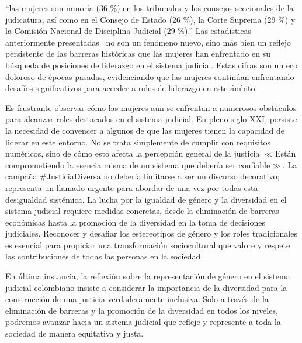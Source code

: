 \documentclass[letterpaper, 12pt]{article}
\renewcommand{\comment}[1]{{\small $\ll$#1$\gg$}}
\begin{document}
“las mujeres son minoría (36 \%) en los tribunales y los consejos
seccionales de la judicatura, así como en el Consejo de Estado
(26 \%), la Corte Suprema (29 \%) y la Comisión Nacional de
Disciplina Judicial (29 \%).” Las estadísticas anteriormente
presentadas~\cite{Dejusticia_2023_MariaAdelaida} no son un fenómeno nuevo,
sino más bien un
reflejo persistente de las barreras históricas que las
mujeres han enfrentado en su búsqueda de posiciones de liderazgo
en el sistema judicial. Estas cifras son un eco doloroso de épocas
pasadas, evidenciando que las mujeres continúan enfrentando
desafíos significativos para acceder a roles de liderazgo en
este ámbito.

Es frustrante observar cómo las mujeres aún se enfrentan a
numerosos obstáculos para alcanzar roles destacados en el
sistema judicial. En pleno siglo XXI, persiste la necesidad
de convencer a algunos de que las mujeres tienen la
capacidad de liderar en este entorno. No se trata
simplemente de cumplir con requisitos numéricos, sino de
cómo esto afecta la percepción general de la justicia
\comment{Están comprometiendo la esencia misma de un
sistema que debería ser confiable}. La campaña
$\#$JusticiaDiversa no debería limitarse a ser un discurso
decorativo; representa un llamado urgente para abordar de
una vez por todas esta desigualdad sistémica. La lucha por
la igualdad de género y la diversidad en el sistema
judicial requiere medidas concretas, desde la eliminación
de barreras económicas hasta la promoción de la diversidad
en la toma de decisiones judiciales. Reconocer y desafiar
los estereotipos de género y los roles tradicionales es
esencial para propiciar una transformación sociocultural
que valore y respete las contribuciones de todas las
personas en la sociedad.

En última instancia, la reflexión sobre la representación
de género en el sistema judicial colombiano insiste a
considerar la importancia de la diversidad para la
construcción de una justicia verdaderamente inclusiva. Solo
a través de la eliminación de barreras y la promoción de la
diversidad en todos los niveles, podremos avanzar hacia un
sistema judicial que refleje y represente a toda la
sociedad de manera equitativa y justa.

\nocite{Colprensa_2016}
\nocite{FiscalíaGeneralNación_2022}
\nocite{Vacía_Vacía_2023}
\nocite{agenda}

\printbibliography
\end{document}
